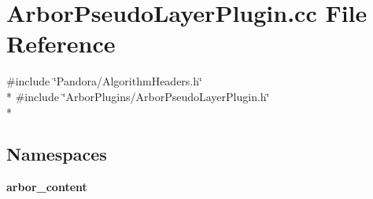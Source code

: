 \section{Arbor\+Pseudo\+Layer\+Plugin.\+cc File Reference}
\label{ArborPseudoLayerPlugin_8cc}
{\ttfamily \#include \char`\"{}Pandora/\+Algorithm\+Headers.\+h\char`\"{}}\\*
{\ttfamily \#include \char`\"{}Arbor\+Plugins/\+Arbor\+Pseudo\+Layer\+Plugin.\+h\char`\"{}}\\*
\subsection*{Namespaces}
\begin{DoxyCompactItemize}
\item 
 {\bf arbor\+\_\+content}
\end{DoxyCompactItemize}
